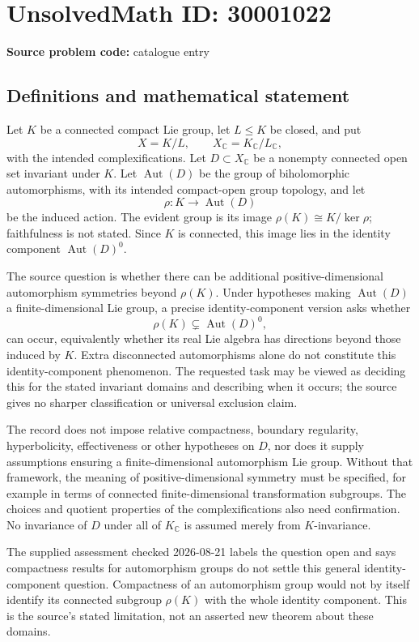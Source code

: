 \documentclass[11pt]{article}
\newcommand{\C}{\mathbb{C}}
\begin{document}
\section*{UnsolvedMath ID: 30001022}
\textbf{Source problem code:} catalogue entry
\subsection{Definitions and mathematical statement}
Let $K$ be a connected compact Lie group, let $L\leq K$ be closed, and put
\[
X=K/L,\qquad X_{\C}=K_{\C}/L_{\C},
\]
with the intended complexifications. Let $D\subset X_{\C}$ be a nonempty connected open set invariant under $K$. Let $\operatorname{Aut}(D)$ be the group of biholomorphic automorphisms, with its intended compact-open group topology, and let
\[
\rho:K\longrightarrow\operatorname{Aut}(D)
\]
be the induced action. The evident group is its image $\rho(K)\cong K/\ker\rho$; faithfulness is not stated. Since $K$ is connected, this image lies in the identity component $\operatorname{Aut}(D)^0$.

The source question is whether there can be additional positive-dimensional automorphism symmetries beyond $\rho(K)$. Under hypotheses making $\operatorname{Aut}(D)$ a finite-dimensional Lie group, a precise identity-component version asks whether
\[
\rho(K)\subsetneq\operatorname{Aut}(D)^0,
\]
can occur, equivalently whether its real Lie algebra has directions beyond those induced by $K$. Extra disconnected automorphisms alone do not constitute this identity-component phenomenon. The requested task may be viewed as deciding this for the stated invariant domains and describing when it occurs; the source gives no sharper classification or universal exclusion claim.

The record does not impose relative compactness, boundary regularity, hyperbolicity, effectiveness or other hypotheses on $D$, nor does it supply assumptions ensuring a finite-dimensional automorphism Lie group. Without that framework, the meaning of positive-dimensional symmetry must be specified, for example in terms of connected finite-dimensional transformation subgroups. The choices and quotient properties of the complexifications also need confirmation. No invariance of $D$ under all of $K_{\C}$ is assumed merely from $K$-invariance.

The supplied assessment checked 2026-08-21 labels the question open and says compactness results for automorphism groups do not settle this general identity-component question. Compactness of an automorphism group would not by itself identify its connected subgroup $\rho(K)$ with the whole identity component. This is the source's stated limitation, not an asserted new theorem about these domains.
\end{document}
